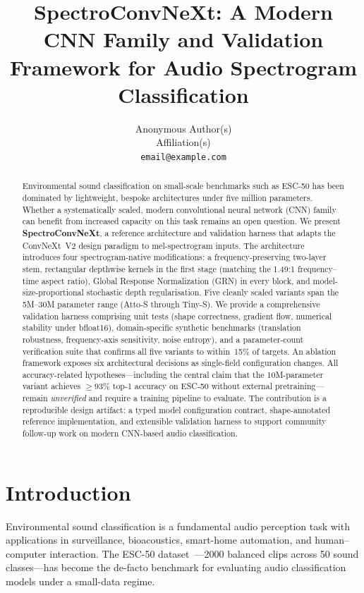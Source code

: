 \documentclass{article}
\title{SpectroConvNeXt: A Modern CNN Family and Validation Framework for Audio Spectrogram Classification}
\author{%
  Anonymous Author(s) \\
  Affiliation(s) \\
  \texttt{email@example.com} \\
}
\begin{document}
\maketitle

\begin{abstract}
Environmental sound classification on small-scale benchmarks such as ESC-50 has
been dominated by lightweight, bespoke architectures under five million
parameters. Whether a systematically scaled, modern convolutional neural network
(CNN) family can benefit from increased capacity on this task remains an open
question. We present \textbf{SpectroConvNeXt}, a reference architecture and
validation harness that adapts the ConvNeXt~V2 design paradigm to mel-spectrogram
inputs. The architecture introduces four spectrogram-native modifications: a
frequency-preserving two-layer stem, rectangular depthwise kernels in the first
stage (matching the 1.49:1 frequency--time aspect ratio), Global Response
Normalization (GRN) in every block, and model-size-proportional stochastic depth
regularisation. Five cleanly scaled variants span the 5M--30M parameter range
(Atto-S through Tiny-S). We provide a comprehensive validation harness comprising
unit tests (shape correctness, gradient flow, numerical stability under bfloat16),
domain-specific synthetic benchmarks (translation robustness, frequency-axis
sensitivity, noise entropy), and a parameter-count verification suite that
confirms all five variants to within~15\% of targets. An ablation framework
exposes six architectural decisions as single-field configuration changes. All
accuracy-related hypotheses---including the central claim that the 10M-parameter
variant achieves $\geq 93\%$ top-1 accuracy on ESC-50 without external
pretraining---remain \emph{unverified} and require a training pipeline to
evaluate. The contribution is a reproducible design artifact: a typed model
configuration contract, shape-annotated reference implementation, and extensible
validation harness to support community follow-up work on modern CNN-based audio
classification.
\end{abstract}

\section{Introduction}

Environmental sound classification is a fundamental audio perception task with
applications in surveillance, bioacoustics, smart-home automation, and
human--computer interaction. The ESC-50 dataset~\citep{piczark2015esc50}---2000
balanced clips across 50 sound classes---has become the de-facto benchmark for
evaluating audio classification models under a small-data regime.
\end{document}
